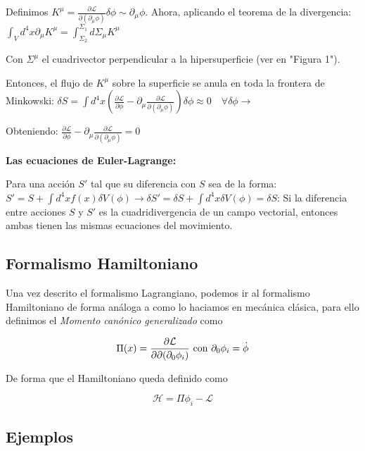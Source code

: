 Definimos $K^\mu = \frac{\partial \mathcal{L}}{\partial (\partial_\mu \phi)} \delta \phi \sim \partial_\mu \phi$. Ahora, aplicando el teorema de la divergencia:
$
\int_V d^4x \partial_\mu K^\mu = \int_{\Sigma_2}^{\Sigma_1} d\Sigma_\mu K^\mu
$

Con $\Sigma^\mu$ el cuadrivector perpendicular a la hipersuperficie (ver en "Figura 1").

Entonces, el flujo de $K^\mu$ sobre la superficie se anula en toda la frontera de Minkowski:
$
\delta S = \int d^4x \left( \frac{\partial \mathcal{L}}{\partial \phi} - \partial_\mu \frac{\partial \mathcal{L}}{\partial (\partial_\mu \phi)} \right) \delta \phi \approx 0 \quad \forall \delta \phi \rightarrow
$

Obteniendo:
$
\frac{\partial \mathcal{L}}{\partial \phi} - \partial_\mu \frac{\partial \mathcal{L}}{\partial (\partial_\mu \phi)} = 0
$

\textbf{Las ecuaciones de Euler-Lagrange:}

Para una acción $S'$ tal que su diferencia con $S$ sea de la forma: $S' = S + \int d^4x f(x)\delta V(\phi) \rightarrow \delta S' = \delta S + \int d^4x \delta V(\phi) = \delta S$: Si la diferencia entre acciones $S$ y $S'$ es la cuadridivergencia de un campo vectorial, entonces ambas tienen las mismas ecuaciones del movimiento.
\subsection{Formalismo Hamiltoniano}

Una vez descrito el formalismo Lagrangiano, podemos ir al formalismo Hamiltoniano de forma análoga a como lo haciamos en mecánica clásica, para ello definimos el \textit{Momento canónico generalizado} como 

\[\Pi(x)=\pdv{\mathcal{L}}{\partial(\partial_{0}\phi_{i})}\text{ con }\partial_{0}\phi_{i}= \dot{\phi}\]

De forma que el Hamiltoniano queda definido como 

\[\mathcal{H}=\Pi\phi_{i}-\mathcal{L}\]

\subsection{Ejemplos}

